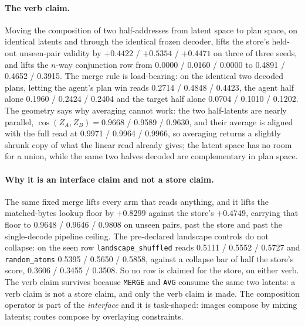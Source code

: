 \documentclass{article} %
\begin{document}
\paragraph{The verb claim.} Moving the composition of two half-addresses from latent space to
plan space, on identical latents and through the identical frozen decoder, lifts the store's
held-out unseen-pair validity by $+0.4422$ / $+0.5354$ / $+0.4471$ on three of three seeds, and
lifts the $n$-way conjunction row from 0.0000 / 0.0160 / 0.0000 to 0.4891 / 0.4652 / 0.3915.
The merge rule is load-bearing: on the identical two decoded plans, letting the agent's plan
win reads 0.2714 / 0.4848 / 0.4423, the agent half alone 0.1960 / 0.2424 / 0.2404 and the target
half alone 0.0704 / 0.1010 / 0.1202. %
The geometry says why averaging cannot work: the two half-latents are nearly parallel,
$\cos(Z_A,Z_B)=0.9668$ / 0.9589 / 0.9630, and their average is aligned with the full read at
0.9971 / 0.9964 / 0.9966, so averaging returns a slightly shrunk copy of what the linear read
already gives; the latent space has no room for a union, while the same two halves decoded are
complementary in plan space. %

\paragraph{Why it is an interface claim and not a store claim.} The same fixed merge lifts every
arm that reads anything, and it lifts the matched-bytes lookup floor by $+0.8299$ against the
store's $+0.4749$, carrying that floor to 0.9648 / 0.9646 / 0.9808 on unseen pairs, past the
store and past the single-decode pipeline ceiling. %
The pre-declared landscape controls do not collapse: on the seen row \texttt{landscape\_shuffled} reads 0.5111
/ 0.5552 / 0.5727 and \texttt{random\_atoms} 0.5395 / 0.5650 / 0.5858, against a collapse bar of
half the store's score, 0.3606 / 0.3455 / 0.3508. %
So no row is claimed for the store, on either verb. The verb claim survives because
\texttt{MERGE} and \texttt{AVG} consume the same two latents: a verb claim is not a store claim,
and only the verb claim is made. The composition operator is part of the \emph{interface} and it
is task-shaped: images compose by mixing latents; routes compose by overlaying constraints.
\end{document}
